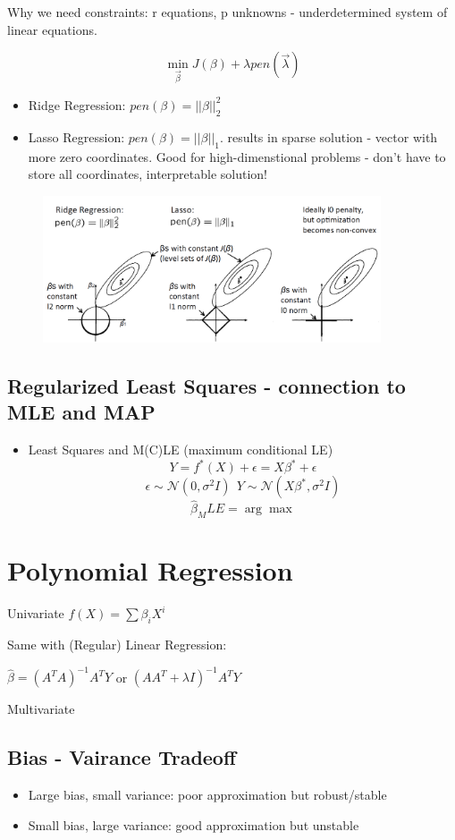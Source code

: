 \documentclass[letterpaper,10pt]{article}
\begin{document}
Why we need constraints: r equations, p unknowns - underdetermined system of linear equations. 

$$\min_{\vec{\beta}} J(\beta)+\lambda pen(\vec{\lambda})$$
\begin{itemize}
	\item Ridge Regression: $pen(\beta)=||\beta||_2^2$
	\item Lasso Regression: $pen(\beta)=||\beta||_1$. results in sparse solution - vector with more zero coordinates. Good for high-dimenstional problems - don't have to store all coordinates, interpretable solution!
\end{itemize}

\begin{figure}[!h]
	\centering
	\includegraphics[width=10cm]{./img/ridgeregression.png}
\end{figure}

\subsection{Regularized Least Squares - connection to MLE and MAP}

\begin{itemize}
	\item Least Squares and M(C)LE (maximum conditional LE)
	$$Y=f^*(X)+\epsilon=X\beta^*+\epsilon$$
	$$\epsilon \sim \mathcal{N}(0,\sigma^2I)~~Y\sim\mathcal{N}(X\beta^*,\sigma^2I)$$
	$$\hat{\beta}_MLE = \arg\max$$
\end{itemize}

\section{Polynomial Regression}

Univariate $f(X)=\sum{\beta_iX^i}$

Same with (Regular) Linear Regression:

$\hat{\beta}=(A^TA)^{-1}A^TY$ or $(AA^T+\lambda I)^{-1}A^TY$

Multivariate

\subsection{Bias - Vairance Tradeoff}
\begin{itemize}
	\item Large bias, small variance: poor approximation but robust/stable
	\item Small bias, large variance: good approximation but unstable
\end{itemize}
\end{document}
